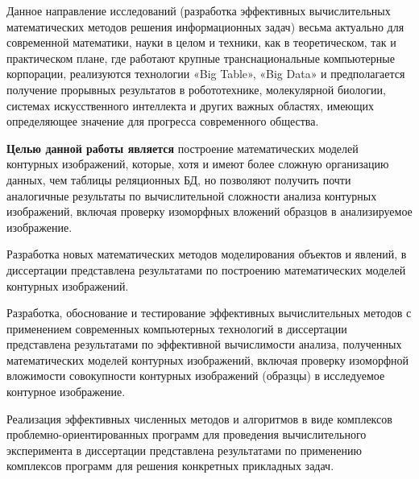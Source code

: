 Данное направление исследований (разработка эффективных вычислительных математических методов решения информационных задач) весьма актуально для современной математики, науки в целом и техники, как в теоретическом, так и  практическом плане, где работают крупные транснациональные компьютерные корпорации, реализуются технологии «Big Table»,  «Big Data» и предполагается получение прорывных результатов в робототехнике, молекулярной биологии, системах искусственного интеллекта и других важных областях, имеющих определяющее значение для прогресса современного общества\cite{D22, D23}.

\textbf{Целью данной работы является} построение математических моделей контурных изображений, которые, хотя и имеют более сложную организацию данных, чем  таблицы реляционных БД, но позволяют получить почти аналогичные результаты по вычислительной сложности  анализа контурных изображений, включая проверку изоморфных вложений образцов в анализируемое изображение.

Разработка новых математических методов моделирования объектов и явлений, в диссертации представлена результатами по построению математических моделей контурных изображений.

Разработка, обоснование и тестирование эффективных вычислительных методов с применением современных компьютерных технологий в диссертации представлена результатами по эффективной вычислимости анализа, полученных математических моделей контурных изображений, включая проверку изоморфной вложимости совокупности контурных изображений (образцы) в исследуемое контурное изображение.

Реализация эффективных численных методов и алгоритмов в виде комплексов проблемно-ориентированных программ для проведения вычислительного эксперимента в диссертации представлена результатами по применению комплексов программ для решения конкретных прикладных задач.

